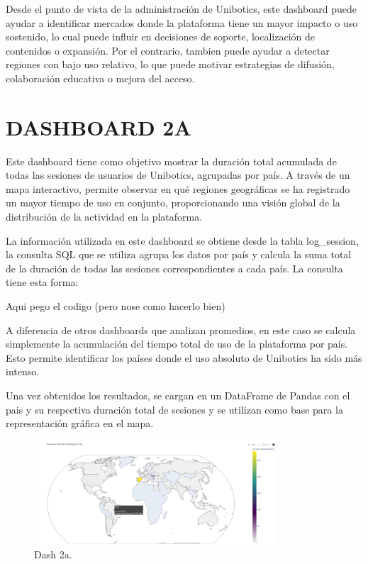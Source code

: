 \documentclass[a4paper, 12pt]{book}
\begin{document}
Desde el punto de vista de la administración de Unibotics, este dashboard puede ayudar a identificar mercados donde la plataforma tiene un mayor impacto o uso sostenido, lo cual puede influir en decisiones de soporte, localización de contenidos o expansión. Por el contrario, tambien puede ayudar a detectar regiones con bajo uso relativo, lo que puede motivar estrategias de difusión, colaboración educativa o mejora del acceso.

\section{DASHBOARD 2A}

Este dashboard tiene como objetivo mostrar la duración total acumulada de todas las sesiones de usuarios de Unibotics, agrupadas por país. A través de un mapa interactivo, permite observar en qué regiones geográficas se ha registrado un mayor tiempo de uso en conjunto, proporcionando una visión global de la distribución de la actividad en la plataforma.

La información utilizada en este dashboard se obtiene desde la tabla log\_session, la consulta SQL que se utiliza agrupa los datos por país y calcula la suma total de la duración de todas las sesiones correspondientes a cada país. La consulta tiene esta forma:

Aqui pego el codigo (pero nose como hacerlo bien)

A diferencia de otros dashboards que analizan promedios, en este caso se calcula simplemente la acumulación del tiempo total de uso de la plataforma por país. Esto permite identificar los países donde el uso absoluto de Unibotics ha sido más intenso.

Una vez obtenidos los resultados, se cargan en un DataFrame de Pandas con el pais y su respectiva duración total de sesiones y se utilizan como base para la representación gráfica en el mapa.

\begin{figure}
  \centering
  \includegraphics[width=9cm, keepaspectratio]{img/2a.png}
  \caption{Dash 2a.}\label{fig:2a}
\end{figure}
\end{document}
